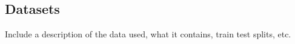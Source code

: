 \subsection{Datasets}
Include a description of the data used, what it contains, train test splits, etc.
